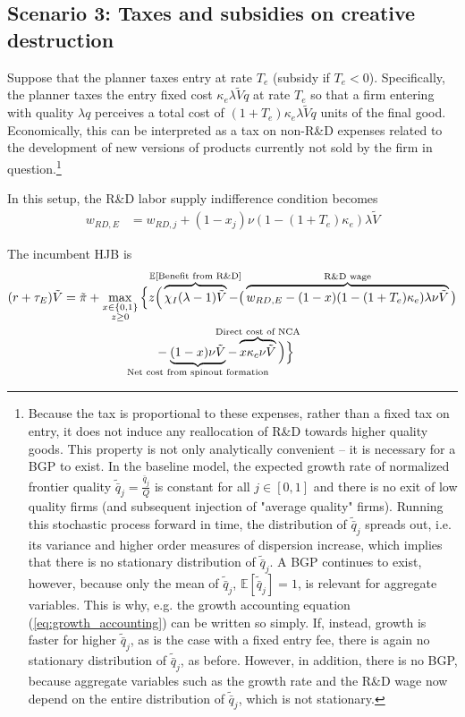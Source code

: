 \documentclass[11pt,english]{article}
\theoremstyle{remark}
\begin{document}
\subsection{Scenario 3: Taxes and subsidies on creative destruction}

Suppose that the planner taxes entry at rate $T_e$ (subsidy if $T_e < 0$). Specifically, the planner taxes the entry fixed cost $\kappa_e \lambda \tilde{V} q$ at rate $T_e$ so that a firm entering with quality $\lambda q$ perceives a total cost of $(1+T_e) \kappa_e \lambda \tilde{V}q$ units of the final good. Economically, this can be interpreted as a tax on non-R\&D expenses related to the development of new versions of products currently not sold by the firm in question.\footnote{Because the tax is proportional to these expenses, rather than a fixed tax on entry, it does not induce any reallocation of R\&D towards higher quality goods. This property is not only analytically convenient -- it is necessary for a BGP to exist. In the baseline model, the expected growth rate of normalized frontier quality $\tilde{\bar{q}}_j = \frac{\bar{q}_j}{Q}$ is constant for all $j \in [0,1]$ and there is no exit of low quality firms (and subsequent injection of "average quality" firms). Running this stochastic process forward in time, the distribution of $\tilde{\bar{q}}_j$ spreads out, i.e. its variance and higher order measures of dispersion increase, which implies that there is no stationary distribution of $\tilde{\bar{q}}_j$. A BGP continues to exist, however, because only the mean of $\tilde{\bar{q}}_j$, $\mathbb{E}[\tilde{\bar{q}}_j] = 1$, is relevant for aggregate variables. This is why, e.g. the growth accounting equation (\ref{eq:growth_accounting}) can be written so simply. If, instead, growth is faster for higher $\tilde{\bar{q}}_j$, as is the case with a fixed entry fee, there is again no stationary distribution of $\tilde{\bar{q}}_j$, as before. However, in addition, there is no BGP, because aggregate variables such as the growth rate and the R\&D wage now depend on the entire distribution of $\tilde{\bar{q}}_j$, which is not stationary.}

In this setup, the R\&D labor supply indifference condition becomes
\begin{align}
	w_{RD,E} &= w_{RD,j} + (1-x_j) \nu (1-(1+T_e)\kappa_e) \lambda \tilde{V} \label{eq:RD_worker_indifference_entryTax}
\end{align}

The incumbent HJB is
\begin{align}
(r + \tau_E) \tilde{V} = \tilde{\pi} + \max_{\substack{x \in \{0,1\} \\ z \ge 0}} \Big\{z &\Big( \overbrace{\chi_I (\lambda - 1) \tilde{V}}^{\mathclap{\mathbb{E}[\textrm{Benefit from R\&D}]}}-  \big( \overbrace{w_{RD,E} - (1-x)(1-(1+T_e)\kappa_e)\lambda \nu \tilde{V}}^{\mathclap{\text{R\&D wage}}}\big) \label{eq:hjb_incumbent_entryTax} \nonumber \\ 
&-  \underbrace{(1-x) \nu \tilde{V}}_{\mathclap{\text{Net cost from spinout formation}}} - \overbrace{x \kappa_{c} \nu \tilde{V}}^{\mathclap{\text{Direct cost of NCA}}}\Big) \Big\} 
\end{align}
\end{document}
